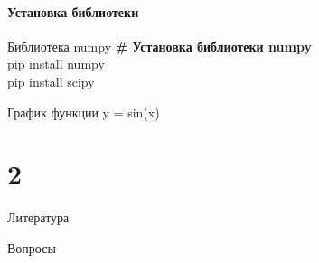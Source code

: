 \documentclass[12pt]{beamer}
\begin{document}
\subsection{Установка библиотеки}
\begin{frame}{Библиотека numpy}
\textbf{\# Установка библиотеки numpy} \\
\vspace{0.5cm}
pip install numpy \\
\vspace{0.2cm}
pip install scipy
\end{frame}


\begin{frame}{График функции y = sin(x)}

\end{frame}


\part{2}

\begin{frame}[t]{Литература}

\end{frame}


\begin{frame}[t]{Вопросы}
\vspace{0.7cm}
 \\
\end{frame}
\end{document}
